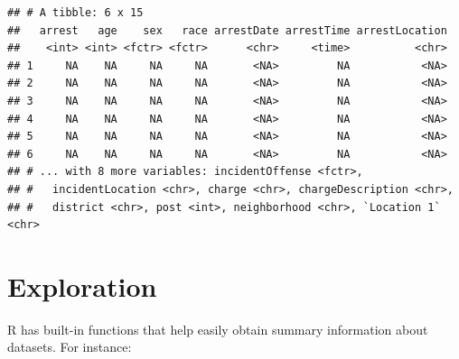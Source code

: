 \documentclass[]{book}
\newenvironment{Shaded}{\begin{snugshade}}{\end{snugshade}}
\newcommand{\KeywordTok}[1]{\textcolor[rgb]{0.13,0.29,0.53}{\textbf{#1}}}
\newcommand{\DecValTok}[1]{\textcolor[rgb]{0.00,0.00,0.81}{#1}}
\newcommand{\StringTok}[1]{\textcolor[rgb]{0.31,0.60,0.02}{#1}}
\newcommand{\CommentTok}[1]{\textcolor[rgb]{0.56,0.35,0.01}{\textit{#1}}}
\newcommand{\OperatorTok}[1]{\textcolor[rgb]{0.81,0.36,0.00}{\textbf{#1}}}
\newcommand{\NormalTok}[1]{#1}
\theoremstyle{definition}
\theoremstyle{definition}
\theoremstyle{remark}
\begin{document}
\begin{Shaded}
\end{Shaded}

\begin{verbatim}
## # A tibble: 6 x 15
##   arrest   age    sex   race arrestDate arrestTime arrestLocation
##    <int> <int> <fctr> <fctr>      <chr>     <time>          <chr>
## 1     NA    NA     NA     NA       <NA>         NA           <NA>
## 2     NA    NA     NA     NA       <NA>         NA           <NA>
## 3     NA    NA     NA     NA       <NA>         NA           <NA>
## 4     NA    NA     NA     NA       <NA>         NA           <NA>
## 5     NA    NA     NA     NA       <NA>         NA           <NA>
## 6     NA    NA     NA     NA       <NA>         NA           <NA>
## # ... with 8 more variables: incidentOffense <fctr>,
## #   incidentLocation <chr>, charge <chr>, chargeDescription <chr>,
## #   district <chr>, post <int>, neighborhood <chr>, `Location 1` <chr>
\end{verbatim}

\begin{Shaded}
\end{Shaded}

\section{Exploration}\label{exploration}

R has built-in functions that help easily obtain summary information
about datasets. For instance:
\end{document}
